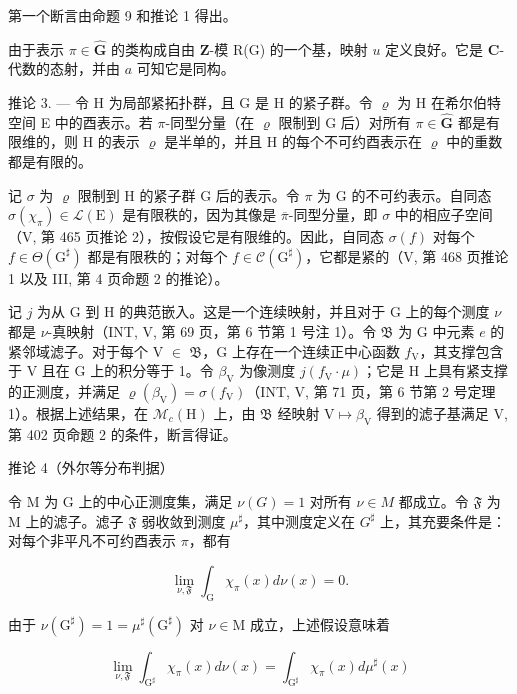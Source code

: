 第一个断言由命题 9 和推论 1 得出。

由于表示 \(\pi \in \widehat{\mathbf{G}}\) 的类构成自由 \(\mathbf{Z}\)-模 R(G) 的一个基，映射 \(u\) 定义良好。它是 \(\mathbf{C}\)-代数的态射，并由 \(a\) 可知它是同构。

推论 3. --- 令 H 为局部紧拓扑群，且 G 是 H 的紧子群。令 \(\varrho\) 为 H 在希尔伯特空间 E 中的酉表示。若 \(\pi\)-同型分量（在 \(\varrho\) 限制到 G 后）对所有 \(\pi \in \widehat{\mathbf{G}}\) 都是有限维的，则 H 的表示 \(\varrho\) 是半单的，并且 H 的每个不可约酉表示在 \(\varrho\) 中的重数都是有限的。

记 \(\sigma\) 为 \(\varrho\) 限制到 H 的紧子群 G 后的表示。令 \(\pi\) 为 G 的不可约表示。自同态 \(\sigma(\chi_{\pi}) \in \mathcal{L}(\mathrm{E})\) 是有限秩的，因为其像是 \(\overline{\pi}\)-同型分量，即 \(\sigma\) 中的相应子空间（V, 第 465 页推论 2），按假设它是有限维的。因此，自同态 \(\sigma(f)\) 对每个 \(f \in \Theta(\mathrm{G}^{\sharp})\) 都是有限秩的；对每个 \(f \in \mathcal{C}(\mathrm{G}^{\sharp})\)，它都是紧的（V, 第 468 页推论 1 以及 III, 第 4 页命题 2 的推论）。

记 \(j\) 为从 G 到 H 的典范嵌入。这是一个连续映射，并且对于 G 上的每个测度 \(\nu\) 都是 \(\nu\)-真映射（INT, V, 第 69 页，第 6 节第 1 号注 1）。令 \(\mathfrak{B}\) 为 G 中元素 \(e\) 的紧邻域滤子。对于每个 V \(\in\) \(\mathfrak{B}\)，G 上存在一个连续正中心函数 \(f_{\mathrm{V}}\)，其支撑包含于 V 且在 G 上的积分等于 1。令 \(\beta_{\mathrm{V}}\) 为像测度 \(j(f_{\mathrm{V}} \cdot \mu)\)；它是 H 上具有紧支撑的正测度，并满足 \(\varrho(\beta_{\mathrm{V}}) = \sigma(f_{\mathrm{V}})\)（INT, V, 第 71 页，第 6 节第 2 号定理 1）。根据上述结果，在 \(\mathcal{M}_{c}(\mathrm{H})\) 上，由 \(\mathfrak{B}\) 经映射 \(\mathrm{V} \mapsto \beta_{\mathrm{V}}\) 得到的滤子基满足 V, 第 402 页命题 2 的条件，断言得证。

推论 4（外尔等分布判据）

令 M 为 G 上的中心正测度集，满足 \(\nu(G)=1\) 对所有 \(\nu\in M\) 都成立。令 \(\mathfrak{F}\) 为 M 上的滤子。滤子 \(\mathfrak{F}\) 弱收敛到测度 \(\mu^{\sharp}\)，其中测度定义在 \(G^{\sharp}\) 上，其充要条件是：对每个非平凡不可约酉表示 \(\pi\)，都有

\[
\lim _ {\nu , \mathfrak {F}} \int_ {\mathrm{G}} \chi_ {\pi} (x) d \nu (x) = 0.
\]

由于 \(\nu (\mathrm{G}^{\sharp}) = 1 = \mu^{\sharp}(\mathrm{G}^{\sharp})\) 对 \(\nu \in \mathrm{M}\) 成立，上述假设意味着

\[
\lim _ {\nu , \mathfrak {F}} \int_ {\mathrm{G} ^ {\sharp}} \chi_ {\pi} (x) d \nu (x) = \int_ {\mathrm{G} ^ {\sharp}} \chi_ {\pi} (x) d \mu^ {\sharp} (x)
\]

